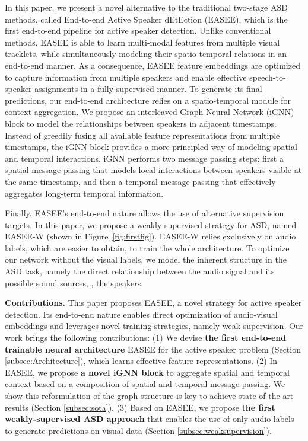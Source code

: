 \documentclass[10pt,twocolumn,letterpaper]{article}
\begin{document}
In this paper, we present a novel alternative to the traditional two-stage ASD methods, called End-to-end Active Speaker dEtEction (EASEE), which is the first end-to-end pipeline for active speaker detection. Unlike conventional methods, EASEE is able to learn multi-modal features from multiple visual tracklets, while simultaneously modeling their spatio-temporal relations in an end-to-end manner. As a consequence, EASEE feature embeddings are optimized to capture information from multiple speakers and enable effective speech-to-speaker assignments in a fully supervised manner. To generate its final predictions, our end-to-end architecture relies on a spatio-temporal module for context aggregation. We propose an interleaved Graph Neural Network (iGNN) block to model the relationships between speakers in adjacent timestamps. Instead of greedily fusing all available feature representations from multiple timestamps, the iGNN block provides a more principled way of modeling spatial and temporal interactions. iGNN performs two message passing steps: first a spatial message passing that models local interactions between speakers visible at the same timestamp, and then a temporal message passing that effectively aggregates long-term temporal information.

Finally, EASEE's end-to-end nature allows the use of alternative supervision targets. In this paper, we propose a weakly-supervised strategy for ASD, named EASEE-W (shown in Figure~\ref{fig:firstfig}). 
EASEE-W relies exclusively on audio labels, which are easier to obtain, to train the whole architecture. To optimize our network without the visual labels, we model the inherent structure in the ASD task, namely the direct relationship between the audio signal and its possible sound sources, \ie, the speakers.

\noindent \textbf{Contributions.} This paper proposes EASEE, a novel strategy for active speaker detection. Its end-to-end nature enables direct optimization of audio-visual embeddings and leverages novel training strategies, namely weak supervision. Our work brings the following contributions: (1) We devise \textbf{the first end-to-end trainable neural architecture} EASEE for the active speaker problem (Section \ref{subsec:Architecture}), which learns effective feature representations. (2) In EASEE, we propose \textbf{a novel iGNN block} to aggregate spatial and temporal context based on a composition of spatial and temporal message passing. We show this reformulation of the graph structure is key to achieve state-of-the-art results (Section \ref{subsec:sota}). (3) Based on EASEE, we propose \textbf{the first weakly-supervised ASD approach} that enables the use of only audio labels to generate predictions on visual data (Section \ref{subsec:weaksupervision}). 
\end{document}
